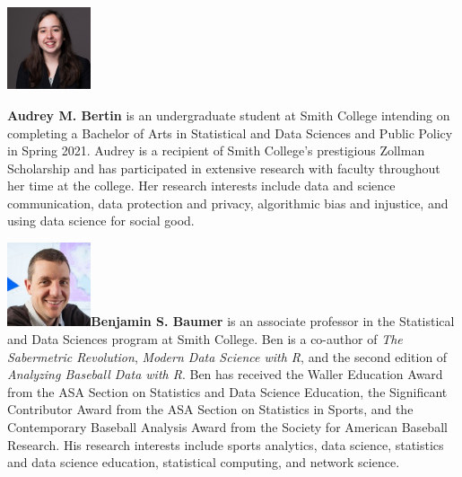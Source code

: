 \documentclass[APA,LATO1COL]{WileyNJD-v2}\usepackage[]{graphicx}\usepackage[]{color}
\begin{document}
\begin{biography}{\includegraphics[width=70pt,height=70pt]{audrey_bio}}{\textbf{Audrey M. Bertin} is an undergraduate student at Smith College intending on completing a Bachelor of Arts in Statistical and Data Sciences and Public Policy in Spring 2021. Audrey is a recipient of Smith College's prestigious Zollman Scholarship and has participated in extensive research with faculty throughout her time at the college. Her research interests include data and science communication, data protection and privacy, algorithmic bias and injustice, and using data science for social good.

}
\end{biography}


\begin{biography}{\includegraphics[width=70pt,height=70pt]{ben_bio}}{\textbf{Benjamin S. Baumer} is an associate professor in the Statistical and Data Sciences program at Smith College. Ben is a co-author of \textit{The Sabermetric Revolution}, \textit{Modern Data Science with R}, and the second edition of \textit{Analyzing Baseball Data with R}. Ben has received the Waller Education Award from the ASA Section on Statistics and Data Science Education, the Significant Contributor Award from the ASA Section on Statistics in Sports, and the Contemporary Baseball Analysis Award from the Society for American Baseball Research. His research interests include sports analytics, data science, statistics and data science education, statistical computing, and network science.}
\end{biography}
\end{document}
